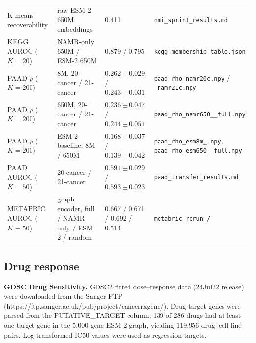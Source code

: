 \documentclass[11pt,a4paper]{article}
\begin{document}
\begin{table}[h]
{\begin{tabular}{@{}llll@{}}
K-means recoverability & raw ESM-2 650M embeddings & 0.411 & \texttt{nmi\_\allowbreak sprint\_\allowbreak results.\allowbreak md} \\
KEGG AUROC ($K=20$) & NAMR-only 650M / ESM-2 650M & 0.879 / 0.795 & \texttt{kegg\_\allowbreak membership\_\allowbreak table.\allowbreak json} \\
PAAD $\rho$ ($K=200$) & 8M, 20-cancer / 21-cancer & $0.262 \pm 0.029$ / $0.243 \pm 0.031$ & \texttt{paad\_\allowbreak rho\_\allowbreak namr20c.\allowbreak npy} / \texttt{\_\allowbreak namr21c.\allowbreak npy} \\
PAAD $\rho$ ($K=200$) & 650M, 20-cancer / 21-cancer & $0.236 \pm 0.047$ / $0.244 \pm 0.051$ & \texttt{paad\_\allowbreak rho\_\allowbreak namr650\_\allowbreak *\_\allowbreak full.\allowbreak npy} \\
PAAD $\rho$ ($K=200$) & ESM-2 baseline, 8M / 650M & $0.168 \pm 0.037$ / $0.139 \pm 0.042$ & \texttt{paad\_\allowbreak rho\_\allowbreak esm8m\_\allowbreak *.\allowbreak npy}, \texttt{paad\_\allowbreak rho\_\allowbreak esm650\_\allowbreak *\_\allowbreak full.\allowbreak npy} \\
PAAD AUROC ($K=50$) & 20-cancer / 21-cancer & $0.591 \pm 0.029$ / $0.593 \pm 0.023$ & \texttt{paad\_\allowbreak transfer\_\allowbreak results.\allowbreak md} \\
METABRIC AUROC ($K=50$) & graph encoder, full / NAMR-only / ESM-2 / random & 0.667 / 0.671 / 0.692 / 0.514 & \texttt{metabric\_\allowbreak rerun\_\allowbreak 20260918/} \\
\bottomrule
\end{tabular}}

\end{table}

\FloatBarrier


\subsection{Drug response}

\textbf{GDSC Drug Sensitivity.} GDSC2 fitted dose--response data (24Jul22 release) were downloaded from the Sanger FTP (https://ftp.sanger.ac.uk/pub/project/cancerrxgene/). Drug target genes were parsed from the PUTATIVE\_TARGET column; 139 of 286 drugs had at least one target gene in the 5,000-gene ESM-2 graph, yielding 119,956 drug--cell line pairs. Log-transformed IC50 values were used as regression targets.
\end{document}
